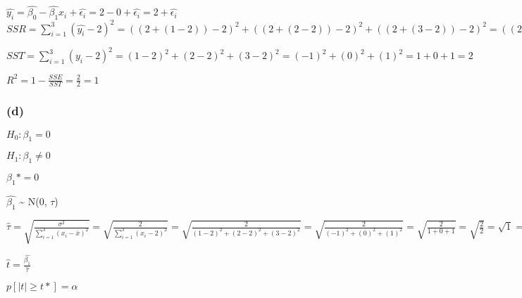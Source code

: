 \documentclass[
]{article}
\begin{document}
\(\hat{y_i} = \hat{\beta_0} - \hat{\beta_1}x_i + \hat{\epsilon_i} = 2 - 0 + \hat{\epsilon_i} = 2 + \hat{\epsilon_i}\)
\(SSR = \sum_{i = 1}^{3}(\hat{y_i} - 2)^2 = ((2 + (1 - 2)) - 2)^2 + ((2 + (2 - 2)) - 2)^2 + ((2 + (3 - 2)) - 2)^2 = ((2 - 1) - 2)^2 + ((2 - 0) - 2)^2 + ((2 + 1) - 2)^2 = (1 - 2)^2 + (2 - 2)^2 + (3 - 2)^2 = (-1)^2 + (0)^2 + (1)^2 = 1 + 0 + 1 = 2\)

\(SST = \sum_{i = 1}^{3}(y_i - 2)^2 = (1 - 2)^2 + (2 - 2)^2 + (3 - 2)^2 = (-1)^2 + (0)^2 + (1)^2 = 1 + 0 + 1 = 2\)

\(R^2 = 1 - \frac{SSE}{SST} = \frac{2}{2} = 1\)

\hypertarget{d}{%
\subsubsection{(d)}\label{d}}

\(H_0: \beta_1 = 0\)

\(H_1: \beta_1 \neq 0\)

\(\beta_1* = 0\)

\(\hat{\beta_1}\) \textasciitilde{} N(0, \(\tau\))

\(\hat{\tau} = \sqrt{\frac{\sigma^2}{\sum_{i = 1}^{3}(x_i - \bar{x})^2}} = \sqrt{\frac{2}{\sum_{i = 1}^{3}(x_i - 2)^2}} = \sqrt{\frac{2}{(1 - 2)^2 + (2 - 2)^2 + (3 - 2)^2}} = \sqrt{\frac{2}{(-1)^2 + (0)^2 + (1)^2}} = \sqrt{\frac{2}{1 + 0 + 1}} = \sqrt{\frac{2}{2}} = \sqrt{1} = 1\)

\(\hat{t} = \frac{\hat{\beta_1}}{\hat{\tau}}\)

\(p[|t| \geq t*] = \alpha\)
\end{document}
